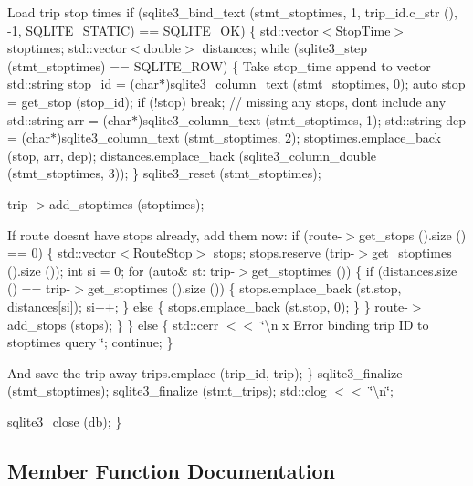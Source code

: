 Load trip stop times if (sqlite3\+\_\+bind\+\_\+text (stmt\+\_\+stoptimes, 1, trip\+\_\+id.\+c\+\_\+str (), -\/1, S\+Q\+L\+I\+T\+E\+\_\+\+S\+T\+A\+T\+IC) == S\+Q\+L\+I\+T\+E\+\_\+\+OK) \{ std\+::vector$<$\+Stop\+Time$>$ stoptimes; std\+::vector$<$double$>$ distances; while (sqlite3\+\_\+step (stmt\+\_\+stoptimes) == S\+Q\+L\+I\+T\+E\+\_\+\+R\+OW) \{ Take stop\+\_\+time append to vector std\+::string stop\+\_\+id = (char$\ast$)sqlite3\+\_\+column\+\_\+text (stmt\+\_\+stoptimes, 0); auto stop = get\+\_\+stop (stop\+\_\+id); if (!stop) break; // missing any stops, don\textquotesingle{}t include any std\+::string arr = (char$\ast$)sqlite3\+\_\+column\+\_\+text (stmt\+\_\+stoptimes, 1); std\+::string dep = (char$\ast$)sqlite3\+\_\+column\+\_\+text (stmt\+\_\+stoptimes, 2); stoptimes.\+emplace\+\_\+back (stop, arr, dep); distances.\+emplace\+\_\+back (sqlite3\+\_\+column\+\_\+double (stmt\+\_\+stoptimes, 3)); \} sqlite3\+\_\+reset (stmt\+\_\+stoptimes);

trip-\/$>$add\+\_\+stoptimes (stoptimes);

If route doesn\textquotesingle{}t have stops already, add them now\+: if (route-\/$>$get\+\_\+stops ().size () == 0) \{ std\+::vector$<$\+Route\+Stop$>$ stops; stops.\+reserve (trip-\/$>$get\+\_\+stoptimes ().size ()); int si = 0; for (auto\& st\+: trip-\/$>$get\+\_\+stoptimes ()) \{ if (distances.\+size () == trip-\/$>$get\+\_\+stoptimes ().size ()) \{ stops.\+emplace\+\_\+back (st.\+stop, distances\mbox{[}si\mbox{]}); si++; \} else \{ stops.\+emplace\+\_\+back (st.\+stop, 0); \} \} route-\/$>$add\+\_\+stops (stops); \} \} else \{ std\+::cerr $<$$<$ \char`\"{}\textbackslash{}n     x Error binding trip I\+D to stoptimes query \char`\"{}; continue; \}

And save the trip away trips.\+emplace (trip\+\_\+id, trip); \} sqlite3\+\_\+finalize (stmt\+\_\+stoptimes); sqlite3\+\_\+finalize (stmt\+\_\+trips); std\+::clog $<$$<$ \char`\"{}\textbackslash{}n\char`\"{};

sqlite3\+\_\+close (db); \}

\subsection{Member Function Documentation}
